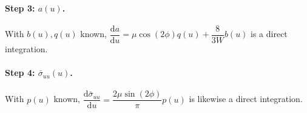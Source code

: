 \documentclass[11pt]{article}
\begin{document}
\paragraph{Step 3: $a(u)$.} With $b(u),q(u)$ known, $\dfrac{\mathrm da}{\mathrm du}=\mu\cos(2\phi)q(u)+\dfrac{8}{3W}b(u)$ is a direct integration.

\paragraph{Step 4: $\bar\sigma_{uu}(u)$.} With $p(u)$ known, $\dfrac{\mathrm d\bar\sigma_{uu}}{\mathrm du}=\dfrac{2\mu\sin(2\phi)}{\pi}p(u)$ is likewise a direct integration.

\end{document}
